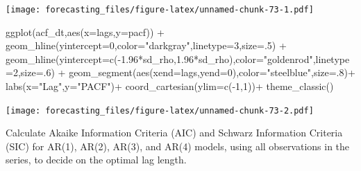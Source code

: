 \documentclass[
  12pt,
  oneside]{book}
\newenvironment{Shaded}{\begin{snugshade}}{\end{snugshade}}
\newcommand{\AttributeTok}[1]{\textcolor[rgb]{0.77,0.63,0.00}{#1}}
\newcommand{\DecValTok}[1]{\textcolor[rgb]{0.00,0.00,0.81}{#1}}
\newcommand{\FloatTok}[1]{\textcolor[rgb]{0.00,0.00,0.81}{#1}}
\newcommand{\FunctionTok}[1]{\textcolor[rgb]{0.00,0.00,0.00}{#1}}
\newcommand{\NormalTok}[1]{#1}
\newcommand{\SpecialCharTok}[1]{\textcolor[rgb]{0.00,0.00,0.00}{#1}}
\newcommand{\StringTok}[1]{\textcolor[rgb]{0.31,0.60,0.02}{#1}}
\begin{document}
\texttt{[image: forecasting\_files/figure-latex/unnamed-chunk-73-1.pdf]}

\begin{Shaded}
\begin{Highlighting}[]
\FunctionTok{ggplot}\NormalTok{(acf\_dt,}\FunctionTok{aes}\NormalTok{(}\AttributeTok{x=}\NormalTok{lags,}\AttributeTok{y=}\NormalTok{pacf)) }\SpecialCharTok{+}
  \FunctionTok{geom\_hline}\NormalTok{(}\AttributeTok{yintercept=}\DecValTok{0}\NormalTok{,}\AttributeTok{color=}\StringTok{"darkgray"}\NormalTok{,}\AttributeTok{linetype=}\DecValTok{3}\NormalTok{,}\AttributeTok{size=}\NormalTok{.}\DecValTok{5}\NormalTok{) }\SpecialCharTok{+}
  \FunctionTok{geom\_hline}\NormalTok{(}\AttributeTok{yintercept=}\FunctionTok{c}\NormalTok{(}\SpecialCharTok{{-}}\FloatTok{1.96}\SpecialCharTok{*}\NormalTok{sd\_rho,}\FloatTok{1.96}\SpecialCharTok{*}\NormalTok{sd\_rho),}\AttributeTok{color=}\StringTok{"goldenrod"}\NormalTok{,}\AttributeTok{linetype=}\DecValTok{2}\NormalTok{,}\AttributeTok{size=}\NormalTok{.}\DecValTok{6}\NormalTok{) }\SpecialCharTok{+}
  \FunctionTok{geom\_segment}\NormalTok{(}\FunctionTok{aes}\NormalTok{(}\AttributeTok{xend=}\NormalTok{lags,}\AttributeTok{yend=}\DecValTok{0}\NormalTok{),}\AttributeTok{color=}\StringTok{"steelblue"}\NormalTok{,}\AttributeTok{size=}\NormalTok{.}\DecValTok{8}\NormalTok{)}\SpecialCharTok{+}
  \FunctionTok{labs}\NormalTok{(}\AttributeTok{x=}\StringTok{"Lag"}\NormalTok{,}\AttributeTok{y=}\StringTok{"PACF"}\NormalTok{)}\SpecialCharTok{+}
  \FunctionTok{coord\_cartesian}\NormalTok{(}\AttributeTok{ylim=}\FunctionTok{c}\NormalTok{(}\SpecialCharTok{{-}}\DecValTok{1}\NormalTok{,}\DecValTok{1}\NormalTok{))}\SpecialCharTok{+}
  \FunctionTok{theme\_classic}\NormalTok{()}
\end{Highlighting}
\end{Shaded}

\texttt{[image: forecasting\_files/figure-latex/unnamed-chunk-73-2.pdf]}

Calculate Akaike Information Criteria (AIC) and Schwarz Information Criteria (SIC) for AR(1), AR(2), AR(3), and AR(4) models, using all observations in the series, to decide on the optimal lag length.
\end{document}
